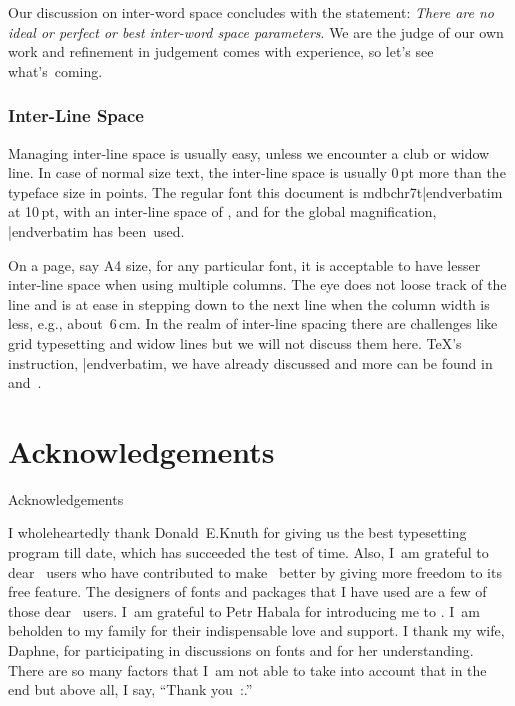 {Our discussion on inter-word space concludes with the statement: {\sl There are no ideal or perfect or best inter-word space parameters}. We are the judge of our own work and refinement in judgement comes with experience, so let's see what's~coming.

\subsubsection{Inter-Line Space}
Managing inter-line space is usually easy, unless we encounter a club or widow line. In case of normal size text, the inter-line space is usually 0\,pt more than the typeface size in points. The regular font this document is {\verbatim mdbchr7t|endverbatim} at 10\,pt, with an inter-line space of {\tt\the\baselineskip}, and for the global magnification, {\verbatim {}|endverbatim} has been~used.

On a page, say A4 size, for any particular font, it is acceptable to have lesser inter-line space when using multiple columns. The eye does not loose track of the line and is at ease in stepping down to the next line when the column width is less, e.g., about~6\,cm. In the realm of inter-line spacing there are challenges like grid typesetting and widow lines but we will not discuss them here. \TeX's instruction, {\color{brown}\verbatim \baselineskip|endverbatim}, we have already discussed and more can be found in \cite{knuth_texbook} and~\cite{against_widows}.



\section{Acknowledgements}{Acknowledgements}

\bs

\ii I wholeheartedly thank Donald~E.\;Knuth for giving us \capstex\emdash the best typesetting program till date, which has succeeded the test of time. Also, I~am grateful to dear \capstex\ users who have contributed to make \capstex\ better by giving more freedom to its free feature. The designers of fonts and packages that I have used are a few of those dear \capstex\ users. I~am grateful to Petr Habala for introducing me to \capstex. I~am beholden to my family for their indispensable love and support. I thank my wife, Daphne, for participating in discussions on fonts and for her understanding. There are so many factors that I~am not able to take into account that in the end but above all, I say, ``Thank you~{\dev :}.''











}
